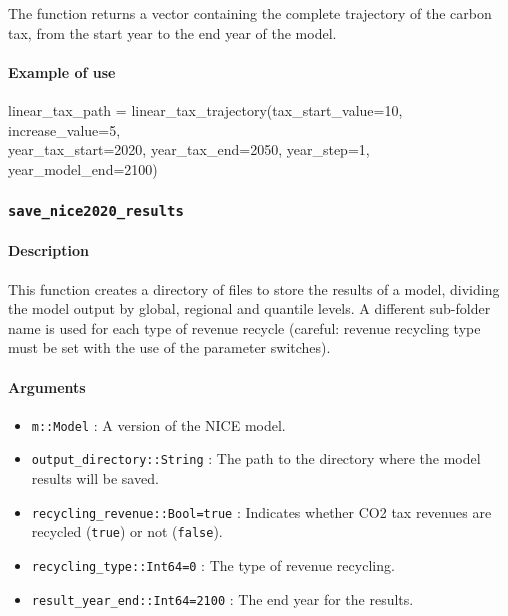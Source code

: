 \documentclass[
]{article}
\newenvironment{Shaded}{}{}
\newcommand{\FloatTok}[1]{\textcolor[rgb]{0.25,0.63,0.44}{#1}}
\newcommand{\FunctionTok}[1]{\textcolor[rgb]{0.02,0.16,0.49}{#1}}
\newcommand{\NormalTok}[1]{#1}
\newcommand{\OperatorTok}[1]{\textcolor[rgb]{0.40,0.40,0.40}{#1}}
\providecommand{\tightlist}{%
  \setlength{\itemsep}{0pt}\setlength{\parskip}{0pt}}
\begin{document}
The function returns a vector containing the complete trajectory of the
carbon tax, from the start year to the end year of the model.

\paragraph{Example of use}\label{example-of-use}

\small
\begin{Shaded}
\begin{Highlighting}[]
\NormalTok{linear\_tax\_path }\OperatorTok{=} \FunctionTok{linear\_tax\_trajectory}\NormalTok{(tax\_start\_value}\OperatorTok{=}\FloatTok{10}\NormalTok{, increase\_value}\OperatorTok{=}\FloatTok{5}\NormalTok{,} \\ 
\NormalTok{year\_tax\_start}\OperatorTok{=}\FloatTok{2020}\NormalTok{, year\_tax\_end}\OperatorTok{=}\FloatTok{2050}\NormalTok{, year\_step}\OperatorTok{=}\FloatTok{1}\NormalTok{, year\_model\_end}\OperatorTok{=}\FloatTok{2100}\NormalTok{)}
\end{Highlighting}
\end{Shaded}
\normalsize

\subsubsection{\texorpdfstring{\texttt{save\_nice2020\_results}}{Save\_nice2020\_results}}\label{save_nicev2_results}

\paragraph{Description}\label{description-2}

This function creates a directory of files to store the results of a
model, dividing the model output by global, regional and quantile
levels. A different sub-folder name is used for each type of revenue recycle (careful: revenue recycling type must be set with the use of the parameter switches).

\paragraph{Arguments}\label{arguments-1}

\begin{itemize}
\tightlist
\item
  \texttt{m::Model} : A version of the NICE model.
\item
\texttt{output\_directory::String} : The path to the directory where the model
  results will be saved.
\item
  \texttt{recycling\_revenue::Bool=true} : Indicates whether CO2 tax
  revenues are recycled (\texttt{true}) or not (\texttt{false}).
\item
  \texttt{recycling\_type::Int64=0} : The type of revenue recycling.
\item
  \texttt{result\_year\_end::Int64=2100} : The end year for the results.
\end{itemize}
\end{document}
